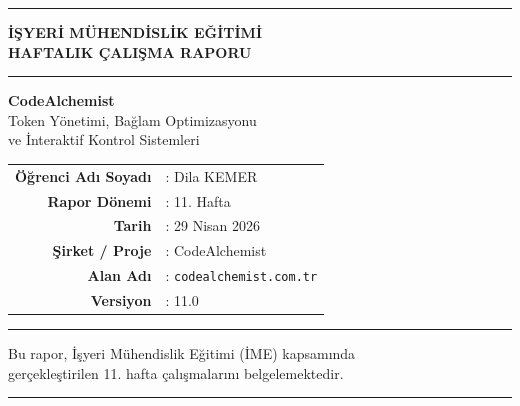 \documentclass[12pt,a4paper]{article}
\begin{document}
\begin{titlepage}
    \centering
    \vspace*{1.2cm}

    {\color{codeblue}\rule{\linewidth}{2pt}}
    \vspace{0.4cm}

    {\LARGE\bfseries\color{codeblue}
        İŞYERİ MÜHENDİSLİK EĞİTİMİ\\[0.3em]
        \large HAFTALIK ÇALIŞMA RAPORU
    }

    \vspace{0.3cm}
    {\color{codeblue}\rule{\linewidth}{0.8pt}}

    \vspace{1.5cm}
    {\Huge\bfseries\color{codeblue!85!black} CodeAlchemist}\\[0.4em]
    {\large\color{accentgray}
        Token Yönetimi, Bağlam Optimizasyonu\\
        ve İnteraktif Kontrol Sistemleri
    }

    \vspace{2cm}

    \begin{tabular}{@{} r l @{}}
        \textbf{Öğrenci Adı Soyadı} & : Dila KEMER \\[0.4em]
        \textbf{Rapor Dönemi}        & : 11. Hafta \\[0.4em]
        \textbf{Tarih}               & : 29 Nisan 2026 \\[0.4em]
        \textbf{Şirket / Proje}      & : CodeAlchemist \\[0.4em]
        \textbf{Alan Adı}            & : \texttt{codealchemist.com.tr} \\[0.4em]
        \textbf{Versiyon}            & : 11.0 \\[0.4em]
    \end{tabular}

    \vfill

    {\color{codeblue}\rule{\linewidth}{0.8pt}}
    \vspace{0.3cm}
    {\small\color{accentgray}
        Bu rapor, İşyeri Mühendislik Eğitimi (İME) kapsamında\\
        gerçekleştirilen 11. hafta çalışmalarını belgelemektedir.
    }
    \vspace{0.2cm}
    {\color{codeblue}\rule{\linewidth}{2pt}}
\end{titlepage}
\end{document}
